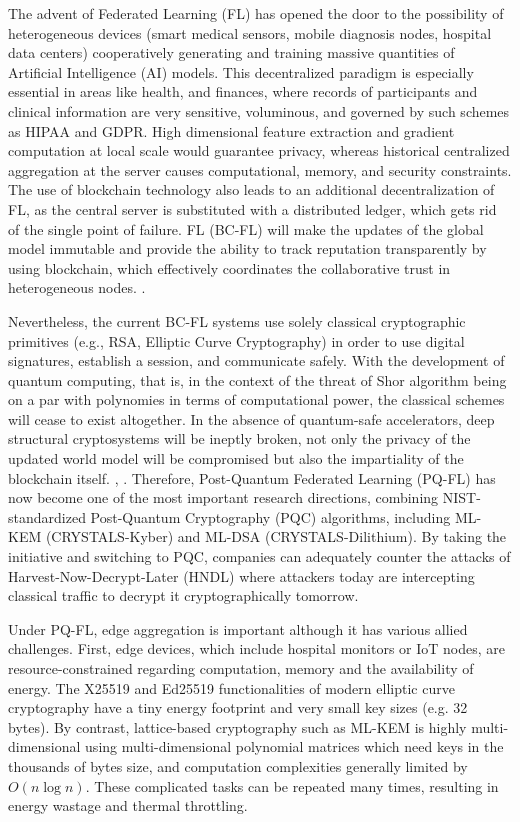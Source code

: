 \documentclass[journal, 10pt, twocolumn]{IEEEtran}
\begin{document}
The advent of Federated Learning (FL) has opened the door to the possibility of heterogeneous devices (smart medical sensors, mobile diagnosis nodes, hospital data centers) cooperatively generating and training massive quantities of Artificial Intelligence (AI) models. This decentralized paradigm is especially essential in areas like health, and finances, where records of participants and clinical information are very sensitive, voluminous, and governed by such schemes as HIPAA and GDPR. High dimensional feature extraction and gradient computation at local scale would guarantee privacy, whereas historical centralized aggregation at the server causes computational, memory, and security constraints. The use of blockchain technology also leads to an additional decentralization of FL, as the central server is substituted with a distributed ledger, which gets rid of the single point of failure. FL (BC-FL) will make the updates of the global model immutable and provide the ability to track reputation transparently by using blockchain, which effectively coordinates the collaborative trust in heterogeneous nodes.
\cite{sharma2022}.

Nevertheless, the current BC-FL systems use solely classical cryptographic primitives (e.g., RSA, Elliptic Curve Cryptography) in order to use digital signatures, establish a session, and communicate safely. With the development of quantum computing, that is, in the context of the threat of Shor algorithm being on a par with polynomies in terms of computational power, the classical schemes will cease to exist altogether. In the absence of quantum-safe accelerators, deep structural cryptosystems will be ineptly broken, not only the privacy of the updated world model will be compromised but also the impartiality of the blockchain itself.
\cite{gharavi2025}, \cite{baseri2025}. Therefore, Post-Quantum Federated Learning (PQ-FL) has now become one of the most important research directions, combining NIST-standardized Post-Quantum Cryptography (PQC) algorithms, including ML-KEM (CRYSTALS-Kyber) and ML-DSA (CRYSTALS-Dilithium). By taking the initiative and switching to PQC, companies can adequately counter the attacks of Harvest-Now-Decrypt-Later (HNDL) where attackers today are intercepting classical traffic to decrypt it cryptographically tomorrow.

Under PQ-FL, edge aggregation is important although it has various allied challenges. First, edge devices, which include hospital monitors or IoT nodes, are resource-constrained regarding computation, memory and the availability of energy. The X25519 and Ed25519 functionalities of modern elliptic curve cryptography have a tiny energy footprint and very small key sizes (e.g. 32 bytes). By contrast, lattice-based cryptography such as ML-KEM is highly multi-dimensional using multi-dimensional polynomial matrices which need keys in the thousands of bytes size, and computation complexities generally limited by $O(n \log n)$. These complicated tasks can be repeated many times, resulting in energy wastage and thermal throttling.
\end{document}
